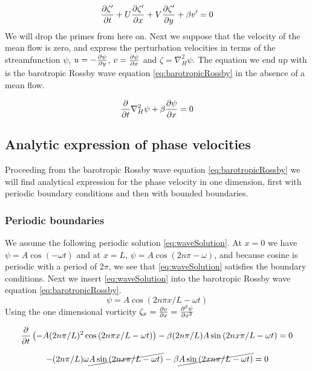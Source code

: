 \begin{equation}
    \pdv{\zeta '}{t} + U\pdv{\zeta'}{x} + V\pdv{\zeta'}{y} + \beta v' = 0
\end{equation}
We will drop the primes from here on. Next we suppose that the velocity of
the mean flow is zero, and express the perturbation velocities in terms of the streamfunction
$\psi$, $u = -\pdv{\psi}{y}$, $v = \pdv{\psi}{x}$ and $\zeta = \nabla_H^2 \psi
$. The equation we end up with is the barotropic Rossby wave equation
\cref{eq:barotropicRossby} in the absence of a mean flow.

\begin{equation}\label{eq:barotropicRossby}
    \pdv{}{t} \nabla_H^2 \psi + \beta \pdv{\psi}{x} = 0
\end{equation}

\subsection{Analytic expression of phase velocities}
Proceeding from the barotropic Rossby wave equation \cref{eq:barotropicRossby}
we will find analytical expression for the phase velocity in
one dimension, first with periodic boundary conditions and then with bounded
boundaries.  
\subsubsection{Periodic boundaries}
We assume the following periodic solution \cref{eq:waveSolution}.
At $x=0$ we have $\psi = A\cos{(-\omega t)}$ and at $x = L$, $\psi = A
\cos{(2n\pi -\omega)}$, and because cosine is periodic with a period of $2\pi$,
we see that \cref{eq:waveSolution} satisfies the boundary conditions.
Next we insert \cref{eq:waveSolution} into the barotropic Rossby wave equation
\cref{eq:barotropicRossby}.
\begin{equation}\label{eq:waveSolution}
    \psi = A\cos{(2n\pi x /L - \omega t)}
\end{equation}
Using the one dimensional vorticity $\zeta_x = \pdv{v}{x} = \pdv[2]{\psi}{x}$

\begin{equation}
    \pdv{}{t} \left(-A (2n\pi/L)^2  \cos{(2n\pi x/L - \omega t)}\right) - \beta
     (2n\pi/L) A \sin{(2n x\pi/L - \omega t) = 0}
\end{equation}

\begin{equation}
    -(2n\pi/L)\omega \cancel{A\sin{(2n x\pi/L - \omega t)}} - \beta
    \cancel{A\sin{(2 xn\pi/L - \omega t)}} = 0
\end{equation}


